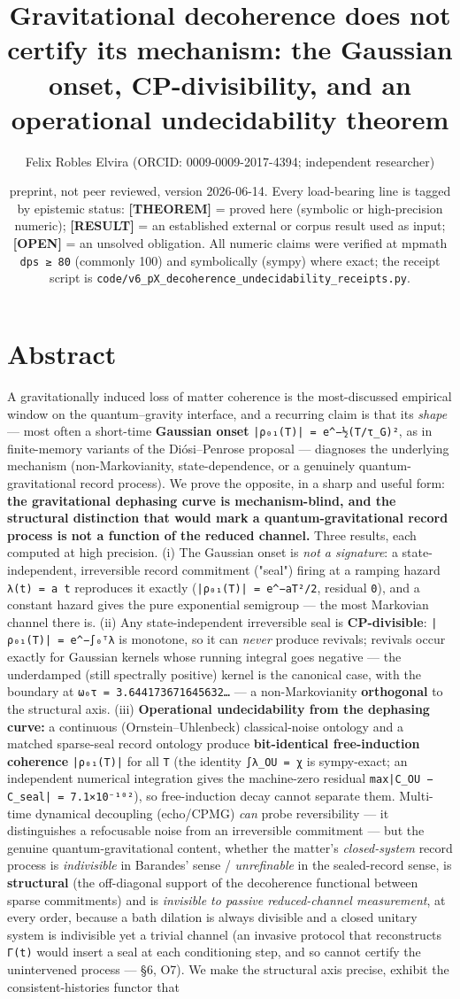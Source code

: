 \documentclass[11pt]{article}
\title{Gravitational decoherence does not certify its mechanism: the Gaussian onset, CP-divisibility, and an operational undecidability theorem}
\author{Felix Robles Elvira (ORCID: 0009-0009-2017-4394; independent researcher)}
\date{\small preprint, not peer reviewed, version 2026-06-14. Every load-bearing line is tagged by epistemic status: \textbf{[THEOREM]} = proved here (symbolic or high-precision numeric); \textbf{[RESULT]} = an established external or corpus result used as input; \textbf{[OPEN]} = an unsolved obligation. All numeric claims were verified at mpmath \texttt{dps ≥ 80} (commonly 100) and symbolically (sympy) where exact; the receipt script is \texttt{code/v6\_pX\_decoherence\_undecidability\_receipts.py}.}
\begin{document}
\maketitle

\section*{Abstract}
A gravitationally induced loss of matter coherence is the most-discussed empirical window on the quantum–gravity interface, and a recurring claim is that its \emph{shape} — most often a short-time \textbf{Gaussian onset} \texttt{|ρ₀₁(T)| = e\textasciicircum{}{−½(T/τ\_G)²}}, as in finite-memory variants of the Diósi–Penrose proposal — diagnoses the underlying mechanism (non-Markovianity, state-dependence, or a genuinely quantum-gravitational record process). We prove the opposite, in a sharp and useful form: \textbf{the gravitational dephasing curve is mechanism-blind, and the structural distinction that would mark a quantum-gravitational record process is not a function of the reduced channel.} Three results, each computed at high precision. (i) The Gaussian onset is \emph{not a signature}: a state-independent, irreversible record commitment ("seal") firing at a ramping hazard \texttt{λ(t) = a t} reproduces it exactly (\texttt{|ρ₀₁(T)| = e\textasciicircum{}{−aT²/2}}, residual \texttt{0}), and a constant hazard gives the pure exponential semigroup — the most Markovian channel there is. (ii) Any state-independent irreversible seal is \textbf{CP-divisible}: \texttt{|ρ₀₁(T)| = e\textasciicircum{}{−∫₀ᵀλ}} is monotone, so it can \emph{never} produce revivals; revivals occur exactly for Gaussian kernels whose running integral goes negative — the underdamped (still spectrally positive) kernel is the canonical case, with the boundary at \texttt{ω₀τ = 3.644173671645632…} — a non-Markovianity \textbf{orthogonal} to the structural axis. (iii) \textbf{Operational undecidability from the dephasing curve:} a continuous (Ornstein–Uhlenbeck) classical-noise ontology and a matched sparse-seal record ontology produce \textbf{bit-identical free-induction coherence} \texttt{|ρ₀₁(T)|} for all \texttt{T} (the identity \texttt{∫λ\_OU = χ} is sympy-exact; an independent numerical integration gives the machine-zero residual \texttt{max|C\_OU − C\_seal| = 7.1×10⁻¹⁰²}), so free-induction decay cannot separate them. Multi-time dynamical decoupling (echo/CPMG) \emph{can} probe reversibility — it distinguishes a refocusable noise from an irreversible commitment — but the genuine quantum-gravitational content, whether the matter's \emph{closed-system} record process is \emph{indivisible} in Barandes' sense / \emph{unrefinable} in the sealed-record sense, is \textbf{structural} (the off-diagonal support of the decoherence functional between sparse commitments) and is \emph{invisible to passive reduced-channel measurement}, at every order, because a bath dilation is always divisible and a closed unitary system is indivisible yet a trivial channel (an invasive protocol that reconstructs \texttt{Γ(t)} would insert a seal at each conditioning step, and so cannot certify the unintervened process — §6, O7). We make the structural axis precise, exhibit the consistent-histories functor that 
\end{document}
